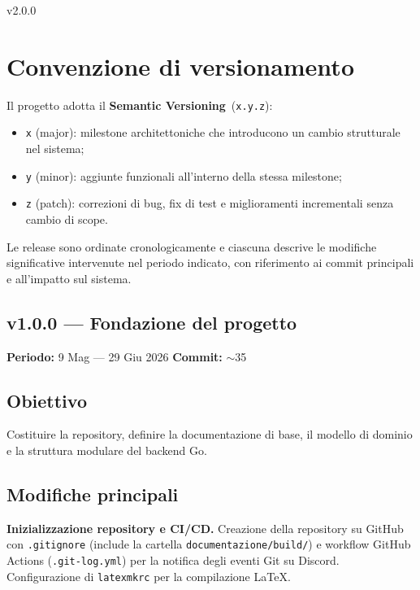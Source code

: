 \documentclass[a4paper,12pt]{article}
\begin{document}
 {v2.0.0}

\section*{Convenzione di versionamento}

Il progetto adotta il \textbf{Semantic Versioning}~(\texttt{x.y.z}):
\begin{itemize}
    \item \texttt{x} (major): milestone architettoniche che introducono un cambio strutturale nel sistema;
    \item \texttt{y} (minor): aggiunte funzionali all'interno della stessa milestone;
    \item \texttt{z} (patch): correzioni di bug, fix di test e miglioramenti incrementali senza cambio di scope.
\end{itemize}

Le release sono ordinate cronologicamente e ciascuna descrive le modifiche significative intervenute nel periodo indicato, con riferimento ai commit principali e all'impatto sul sistema.

\newpage

\begin{decisionbox}
\section*{v1.0.0 --- Fondazione del progetto}
\textbf{Periodo:} 9 Mag --- 29 Giu 2026 \hfill \textbf{Commit:} $\sim$35
\end{decisionbox}

\subsection*{Obiettivo}
Costituire la repository, definire la documentazione di base, il modello di dominio e la struttura modulare del backend Go.

\subsection*{Modifiche principali}

\textbf{Inizializzazione repository e CI/CD.}
Creazione della repository su GitHub con \texttt{.gitignore} (include la cartella \texttt{documentazione/build/}) e workflow GitHub Actions (\texttt{.git-log.yml}) per la notifica degli eventi Git su Discord. Configurazione di \texttt{latexmkrc} per la compilazione LaTeX.
\end{document}
